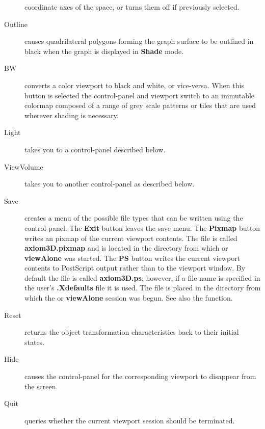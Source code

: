 \begin{description}
coordinate axes of the space, or turns them off if previously selected.
%
\item[Outline] causes
quadrilateral polygons forming the graph surface to be outlined in black when
the graph is displayed in {\bf Shade} mode.
%
\item[BW] converts a color viewport to black and white, or vice-versa.
When this button is selected the
control-panel and viewport switch to an immutable colormap composed of a range
of grey scale patterns or tiles that are used wherever shading is necessary.
%
\item[Light] takes you to a control-panel described below.
%
\item[ViewVolume] takes you to another control-panel as described below.
%
\item[Save] creates a menu of the possible file types that can
be written using the control-panel.
The {\bf Exit} button leaves the save menu.
The {\bf Pixmap} button writes an \Language{} pixmap of
the current viewport contents.  The file is called {\bf axiom3D.pixmap} and is
located in the directory from which \Language{} or {\bf viewAlone} was
started.
The {\bf PS} button writes the current viewport contents to
PostScript output rather than to the viewport window.
By default the file is called {\bf axiom3D.ps}; however, if a file
name is specified in the user's {\bf .Xdefaults} file it is
used.
The file is placed in the directory from which the \Language{} or
{\bf viewAlone} session was begun.
See also the 
function.
%
\item[Reset] returns the object transformation
characteristics back to their initial states.
%
\item[Hide] causes the control-panel for the
corresponding viewport to disappear from the screen.
%
\item[Quit]  queries whether the current viewport
session should be terminated.
\end{description}

